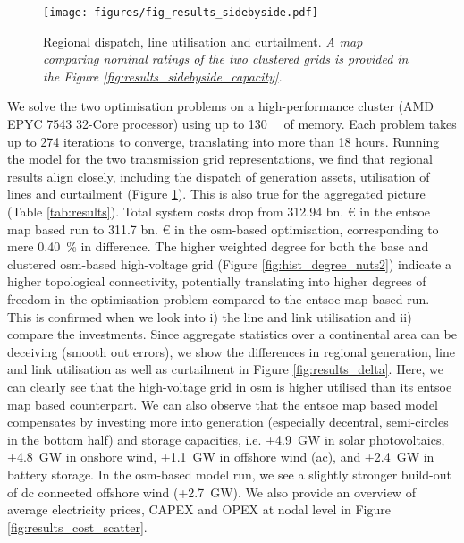 \documentclass[fleqn,10pt]{wlscirep}
\begin{document}
\begin{figure}[!htbp]
    \centering
    \texttt{[image: figures/fig\_results\_sidebyside.pdf]}
    \caption{Regional dispatch, line utilisation and curtailment. \textit{A map comparing nominal ratings of the two clustered grids is provided in the Figure \ref{fig:results_sidebyside_capacity}.}}
    \label{fig:results_sidebyside}
\end{figure}

We solve the two optimisation problems on a high-performance cluster (AMD EPYC 7543 32-Core processor) using up to \SI{130}{\giga\byte} of memory. Each problem takes up to 274 iterations to converge, translating into more than 18 hours. Running the model for the two transmission grid representations, we find that regional results align closely, including the dispatch of generation assets, utilisation of lines and curtailment (Figure \ref{fig:results_sidebyside}). This is also true for the aggregated picture (Table \ref{tab:results}). Total system costs drop from 312.94 bn. \euro{} in the \acrshort{entsoe} map based run to 311.7 bn. € in the \acrshort{osm}-based optimisation, corresponding to mere \SI{0.40}{\percent} in difference. The higher weighted degree for both the base and clustered \acrshort{osm}-based high-voltage grid (Figure \ref{fig:hist_degree_nuts2}) indicate a higher topological connectivity, potentially translating into higher degrees of freedom in the optimisation problem compared to the \acrshort{entsoe} map based run. This is confirmed when we look into i) the line and link utilisation and ii) compare the investments. Since aggregate statistics over a continental area can be deceiving (smooth out errors), we show the differences in regional generation, line and link utilisation as well as curtailment in Figure \ref{fig:results_delta}. Here, we can clearly see that the high-voltage grid in \acrshort{osm} is higher utilised than its \acrshort{entsoe} map based counterpart. We can also observe that the \acrshort{entsoe} map based model compensates by investing more into generation (especially decentral, semi-circles in the bottom half) and storage capacities, i.e. +\SI{4.9}{\giga\watt} in solar photovoltaics, +\SI{4.8}{\giga\watt} in onshore wind, +\SI{1.1}{\giga\watt} in offshore wind (\acrshort{ac}), and +\SI{2.4}{\giga\watt} in battery storage. In the \acrshort{osm}-based model run, we see a slightly stronger build-out of \acrshort{dc} connected offshore wind (+\SI{2.7}{\giga\watt}). We also provide an overview of average electricity prices, CAPEX and OPEX at nodal level in Figure \ref{fig:results_cost_scatter}.
\end{document}
